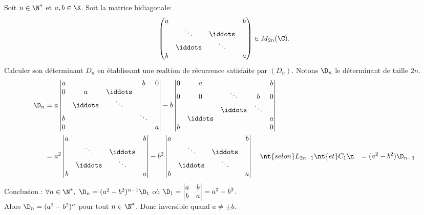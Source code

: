 \documentclass[11pt]{article}
\begin{document}
\pagebreak

\begin{ex}{}{}
    Soit $n\in\N^*$ et $a,b\in\K$. Soit la matrice bidiagonale:
    \begin{equation*}
        \begin{pmatrix}
            a&&&b\\
            &\ddots&\iddots&\\
            &\iddots&\ddots&\\
            b&&&a
        \end{pmatrix}\in M_{2n}(\C).
    \end{equation*}
    Calculer son déterminant $D_n$ en établissant une realtion de récurrence satisfaite par $(D_n)$.
    \tcblower
    Notons $\D_n$ le déterminant de taille $2n$.
    \begin{align*}
        \D_n&=a\begin{vmatrix}
            a&&&b&0\\
            0&a&\iddots&&\\
            &\iddots&\ddots&&\\
            b&&&\ddots&\\
            0&&&&a
        \end{vmatrix}-b\begin{vmatrix}
            0&a&&&b\\
            0&0&\ddots&b&0\\
            &&\iddots&\ddots&\\
            &\iddots&&&a\\
            b&&&&0
        \end{vmatrix}\\
        &=a^2\begin{vmatrix}
            a&&&b\\
            &\ddots&\iddots&\\
            &\iddots&\ddots&\\
            b&&&a
        \end{vmatrix}-b^2\begin{vmatrix}
            a&&&b\\
            &\ddots&\iddots&\\
            &\iddots&\ddots&\\
            b&&&a
        \end{vmatrix} \quad \nt{selon }L_{2n-1} \nt{ et } C_1\n
        &=(a^2-b^2)\D_{n-1}
    \end{align*}
    Conclusion : $\forall n \in \N^*, ~ \D_n = (a^2-b^2)^{n-1}\D_1$ où $\D_1=\begin{vmatrix}
        a&b\\
        b&a
    \end{vmatrix}=a^2-b^2$.\\
    Alors $\D_n=(a^2-b^2)^n$ pour tout $n\in\N^*$.\n
    Donc inversible quand $a\neq\pm b$.
\end{ex}
\end{document}

